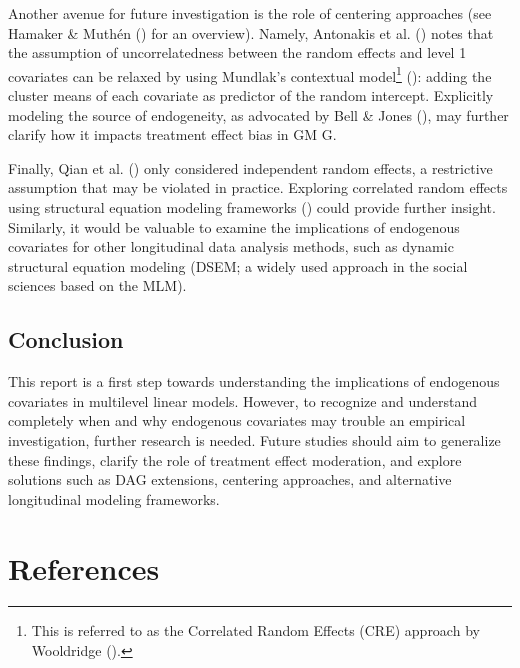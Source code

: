 \documentclass[
  11pt,
  a4paper,
]{article}
\begin{document}
Another avenue for future investigation is the role of centering
approaches (see Hamaker \& Muthén () for
an overview). Namely, Antonakis et al.
() notes that the assumption of
uncorrelatedness between the random effects and level 1 covariates can
be relaxed by using Mundlak's contextual model\footnote{This is referred
  to as the Correlated Random Effects (CRE) approach by Wooldridge
  ().}
(): adding the cluster means of
each covariate as predictor of the random intercept. Explicitly modeling
the source of endogeneity, as advocated by Bell \& Jones
(), may further clarify how it impacts
treatment effect bias in GM G.

Finally, Qian et al. () only considered
independent random effects, a restrictive assumption that may be
violated in practice. Exploring correlated random effects using
structural equation modeling frameworks
() could provide
further insight. Similarly, it would be valuable to examine the
implications of endogenous covariates for other longitudinal data
analysis methods, such as dynamic structural equation modeling (DSEM; a
widely used approach in the social sciences based on the MLM).

\subsection{Conclusion}\label{conclusion}

This report is a first step towards understanding the implications of
endogenous covariates in multilevel linear models. However, to recognize
and understand completely when and why endogenous covariates may trouble
an empirical investigation, further research is needed. Future studies
should aim to generalize these findings, clarify the role of treatment
effect moderation, and explore solutions such as DAG extensions,
centering approaches, and alternative longitudinal modeling frameworks.

\newpage

\section{References}\label{references}
\end{document}
